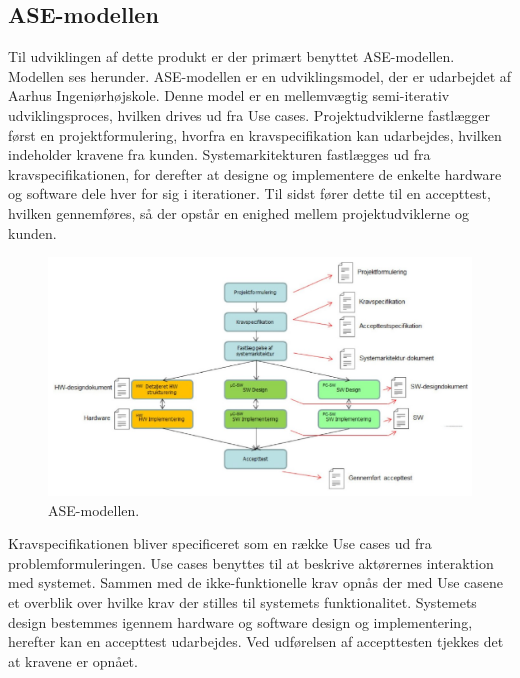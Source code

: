 \subsection{ASE-modellen}
Til udviklingen af dette produkt er der primært benyttet ASE-modellen. Modellen ses herunder. ASE-modellen er en udviklingsmodel, der er udarbejdet af Aarhus Ingeniørhøjskole. Denne model er en mellemvægtig semi-iterativ udviklingsproces, hvilken drives ud fra Use cases. Projektudviklerne fastlægger først en projektformulering, hvorfra en kravspecifikation kan udarbejdes, hvilken indeholder kravene fra kunden. Systemarkitekturen fastlægges ud fra kravspecifikationen, for derefter at designe og implementere de enkelte hardware og software dele hver for sig i iterationer. Til sidst fører dette til en accepttest, hvilken gennemføres, så der opstår en enighed mellem projektudviklerne og kunden.
\begin{figure}[H]
\includegraphics[width =1.0\textwidth , center]{billeder/ASEmodellen}
\caption{ASE-modellen.}
\end{figure} 
Kravspecifikationen bliver specificeret som en række Use cases ud fra problemformuleringen. Use cases benyttes til at beskrive aktørernes interaktion med systemet. Sammen med de ikke-funktionelle krav opnås der med Use casene et overblik over hvilke krav der stilles til systemets funktionalitet. Systemets design bestemmes igennem hardware og software design og implementering, herefter kan en accepttest udarbejdes. Ved udførelsen af accepttesten tjekkes det at kravene er opnået.
